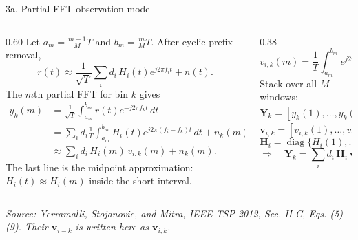 \documentclass[aspectratio=169,10pt]{beamer}
\newcommand{\vY}{\bm{Y}}
\newcommand{\vn}{\bm{n}}
\newcommand{\vv}{\bm{v}}
\newcommand{\vH}{\bm{H}}
\begin{document}
\begin{frame}{3a. Partial-FFT observation model}

  \footnotesize
  \setlength{\abovedisplayskip}{0.35em}
  \setlength{\belowdisplayskip}{0.35em}
  \newcommand{\am}{a_m}
  \newcommand{\bmint}{b_m}
  \begin{columns}[T,onlytextwidth]
    \begin{column}{0.60\textwidth}
      Let $\am=\frac{m-1}{M}T$ and $\bmint=\frac{m}{M}T$.  After cyclic-prefix removal,
      \[
        r(t) \approx \frac{1}{\sqrt{T}}
        \sum_i d_i\,H_i(t)e^{j2\pi f_i t}+n(t).
      \]
      The $m$th partial FFT for bin $k$ gives
      \[
      \begin{aligned}
        y_k(m)
        &=\frac{1}{\sqrt{T}}\int_{\am}^{\bmint}
          r(t)e^{-j2\pi f_k t}\,dt\\
        &=\sum_i d_i\frac{1}{T}\int_{\am}^{\bmint}
          H_i(t)e^{j2\pi(f_i-f_k)t}\,dt+n_k(m)\\
        &\approx
        \sum_i d_i\,H_i(m)\,v_{i,k}(m)+n_k(m).
      \end{aligned}
      \]
      The last line is the midpoint approximation:
      $H_i(t)\approx H_i(m)$ inside the short interval.
    \end{column}

    \begin{column}{0.38\textwidth}
      \[
        v_{i,k}(m)=
        \frac{1}{T}\int_{\am}^{\bmint}
        e^{j2\pi(f_i-f_k)t}\,dt .
      \]
      Stack over all $M$ windows:
      \[
        \vY_k=[y_k(1),\ldots,y_k(M)]^{\mathsf T},
      \]
      \[
        \vv_{i,k}=[v_{i,k}(1),\ldots,v_{i,k}(M)]^{\mathsf T},
      \]
      \[
        \vH_i=\operatorname{diag}\{H_i(1),\ldots,H_i(M)\}.
      \]
      \vspace{0.2em}
      \[
        \Rightarrow\quad
        \boxed{
        \vY_k=\sum_i d_i\,\vH_i\,\vv_{i,k}+\vn_k
        }
      \]
    \end{column}
  \end{columns}

  \vspace{0.2em}
  \begin{center}
    {\itshape\footnotesize Source: Yerramalli, Stojanovic, and Mitra,
    IEEE TSP 2012, Sec. II-C, Eqs. (5)--(9). Their $\vv_{i-k}$ is written here as $\vv_{i,k}$.}
  \end{center}

\end{frame}
\end{document}
